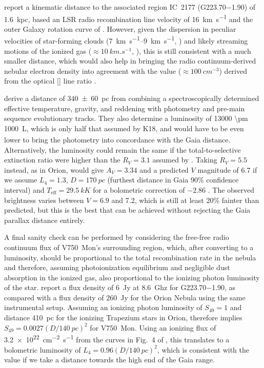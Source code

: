 \documentclass[useAMS, usenatbib, a4paper]{mnras}
\begin{document}
\citet{Quireza:2006b} report a kinematic distance to the associated
\hii{} region IC~2177 (G\num{223.70}\num{-1.90}) of \SI{1.6}{kpc},
based an LSR radio recombination line velocity of \SI{+16}{km.s^{-1}}
\citep{Quireza:2006a} and the outer Galaxy rotation curve of
\citet{Brand:1993a}.  However, given the dispersion in peculiar
velocities of star-forming clouds (\SIrange{7}{9}{km.s^{-1}},
\citealp{Stark:1984a}) and likely streaming motions of the ionized gas
(\(\approx \SI{10}{km.s^{-1}}\), \citealp{Matzner:2002a, Lee:2012a}),
this is still consistent with a much smaller distance, which would
also help in bringing the radio continuum-derived nebular electron
density into agreement with the value (\(\approx \SI{100}{cm^{-3}}\))
derived from the optical [] line ratio
\citep{Hawley:1978a}.

\citet{Fairlamb:2015a} derive a distance of \SI{340 \pm 60}{pc} from
combining a spectroscopically determined effective temperature,
gravity, and reddening with photometry and pre-main sequence
evolutionary tracks.  They also determine a luminosity of \SI{13000
  \pm 1000}{L_\odot}, which is only half that assumed by K18, and
would have to be even lower to bring the photometry into concordance
with the Gaia distance.  Alternatively, the luminosity could remain
the same if the total-to-selective extinction ratio were higher than
the \(R_V = 3.1\) assumed by \citet{Fairlamb:2015a}.  Taking
\(R_V = 5.5\) instead, as in Orion, would give \(A_V = 3.34\) and a
predicted \(V\) magnitude of 6.7 if we assume \(L_4 = 1.3\),
\(D = \SI{170}{pc}\) (furthest distance in Gaia 90\% confidence
interval) and \(T_{\text{eff}} = \SI{29.5}{kK}\)
\citep{Fairlamb:2015a} for a bolometric correction of \(-2.86\)
\citep{Nieva:2013a}.  The observed brightness varies between
\(V = 6.9\) and 7.2, which is still at least 20\% fainter than
predicted, but this is the best that can be achieved without rejecting
the Gaia parallax distance entirely.

A final sanity check can be performed by considering the free-free
radio continuum flux of V750~Mon's surrounding \hii{} region, which,
after converting to a luminosity, should be proportional to the total
recombination rate in the nebula and therefore, assuming
photoionization equilibrium and negligible dust absorption in the
ionized gas, also proportional to the ionizing photon luminosity of
the star.  \citet{Quireza:2006b} report a flux density of \SI{6}{Jy}
at \SI{8.6}{Ghz} for G\num{223.70}\num{-1.90}, as compared with a flux
density of \SI{260}{Jy} for the Orion Nebula using the same
instrumental setup.  Assuming an ionizing photon luminosity of
\(S_{49} = 1\) and distance \SI{410}{pc} for the ionizing Trapezium
stars in Orion, therefore implies
\(S_{49} = 0.0027 (D/\SI{140}{pc})^2\) for V750~Mon.  Using an
ionizing flux of \SI{3.2e22}{cm^{-2}.s^{-1}} from the curves in Fig.~4
of \citet{Sternberg:2003a}, this translates to a bolometric luminosity
of \(L_4 = 0.96 (D/\SI{140}{pc})^2\), which is consistent with the
\citet{Fairlamb:2015a} value if we take a distance towards the high
end of the Gaia range.
\end{document}

